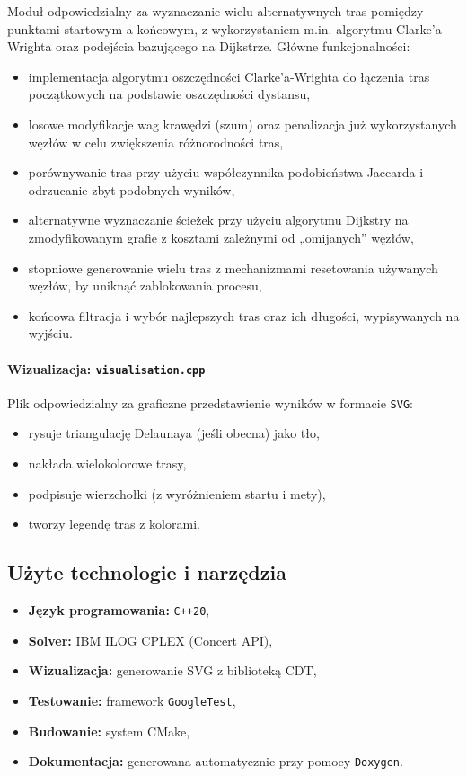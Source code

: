 \documentclass{article}
\begin{document}
Moduł odpowiedzialny za wyznaczanie wielu alternatywnych tras pomiędzy punktami startowym a końcowym, z wykorzystaniem m.in. algorytmu Clarke’a-Wrighta oraz podejścia bazującego na Dijkstrze. Główne funkcjonalności:
\begin{itemize}
    \item implementacja algorytmu oszczędności Clarke’a-Wrighta do łączenia tras początkowych na podstawie oszczędności dystansu,
    \item losowe modyfikacje wag krawędzi (szum) oraz penalizacja już wykorzystanych węzłów w celu zwiększenia różnorodności tras,
    \item porównywanie tras przy użyciu współczynnika podobieństwa Jaccarda i odrzucanie zbyt podobnych wyników,
    \item alternatywne wyznaczanie ścieżek przy użyciu algorytmu Dijkstry na zmodyfikowanym grafie z kosztami zależnymi od „omijanych” węzłów,
    \item stopniowe generowanie wielu tras z mechanizmami resetowania używanych węzłów, by uniknąć zablokowania procesu,
    \item końcowa filtracja i wybór najlepszych tras oraz ich długości, wypisywanych na wyjściu.
\end{itemize}


\paragraph{Wizualizacja: \texttt{visualisation.cpp}}

Plik odpowiedzialny za graficzne przedstawienie wyników w formacie \texttt{SVG}:
\begin{itemize}
    \item rysuje triangulację Delaunaya (jeśli obecna) jako tło,
    \item nakłada wielokolorowe trasy,
    \item podpisuje wierzchołki (z wyróżnieniem startu i mety),
    \item tworzy legendę tras z kolorami.
\end{itemize}

\subsection*{Użyte technologie i narzędzia}

\begin{itemize}
    \item \textbf{Język programowania:} \texttt{C++20},
    \item \textbf{Solver:} IBM ILOG CPLEX (Concert API),
    \item \textbf{Wizualizacja:} generowanie SVG z biblioteką CDT,
    \item \textbf{Testowanie:} framework \texttt{GoogleTest},
    \item \textbf{Budowanie:} system CMake,
    \item \textbf{Dokumentacja:} generowana automatycznie przy pomocy \texttt{Doxygen}.
\end{itemize}
\end{document}
